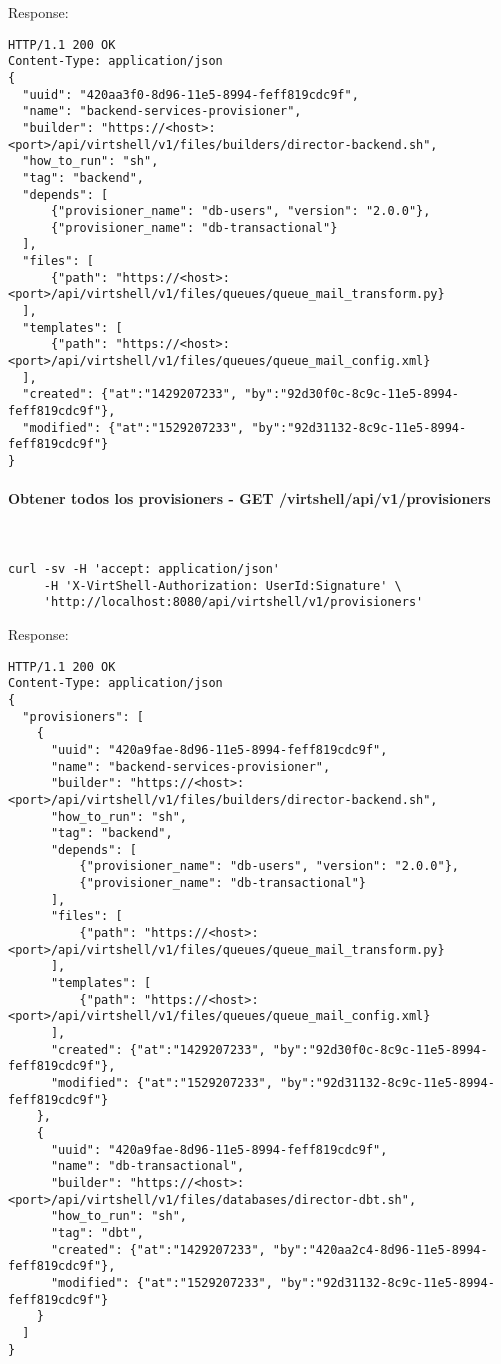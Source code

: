 Response:

\begin{lstlisting}[style=json]
HTTP/1.1 200 OK
Content-Type: application/json
{
  "uuid": "420aa3f0-8d96-11e5-8994-feff819cdc9f",
  "name": "backend-services-provisioner",
  "builder": "https://<host>:<port>/api/virtshell/v1/files/builders/director-backend.sh",
  "how_to_run": "sh",
  "tag": "backend",
  "depends": [
      {"provisioner_name": "db-users", "version": "2.0.0"},
      {"provisioner_name": "db-transactional"}
  ],
  "files": [
      {"path": "https://<host>:<port>/api/virtshell/v1/files/queues/queue_mail_transform.py}
  ],
  "templates": [
      {"path": "https://<host>:<port>/api/virtshell/v1/files/queues/queue_mail_config.xml}
  ],        
  "created": {"at":"1429207233", "by":"92d30f0c-8c9c-11e5-8994-feff819cdc9f"},
  "modified": {"at":"1529207233", "by":"92d31132-8c9c-11e5-8994-feff819cdc9f"}
}
\end{lstlisting}

\paragraph{Obtener todos los provisioners - GET /virtshell/api/v1/provisioners} ~\\

\begin{lstlisting}[style=json]
curl -sv -H 'accept: application/json' 
     -H 'X-VirtShell-Authorization: UserId:Signature' \ 
     'http://localhost:8080/api/virtshell/v1/provisioners'
\end{lstlisting}

Response:

\begin{lstlisting}[style=json]
HTTP/1.1 200 OK
Content-Type: application/json
{
  "provisioners": [
    { 
      "uuid": "420a9fae-8d96-11e5-8994-feff819cdc9f",
      "name": "backend-services-provisioner",
      "builder": "https://<host>:<port>/api/virtshell/v1/files/builders/director-backend.sh",
      "how_to_run": "sh",
      "tag": "backend",
      "depends": [
          {"provisioner_name": "db-users", "version": "2.0.0"},
          {"provisioner_name": "db-transactional"}
      ],
      "files": [
          {"path": "https://<host>:<port>/api/virtshell/v1/files/queues/queue_mail_transform.py}
      ],
      "templates": [
          {"path": "https://<host>:<port>/api/virtshell/v1/files/queues/queue_mail_config.xml}
      ],        
      "created": {"at":"1429207233", "by":"92d30f0c-8c9c-11e5-8994-feff819cdc9f"},
      "modified": {"at":"1529207233", "by":"92d31132-8c9c-11e5-8994-feff819cdc9f"}
    },
    { 
      "uuid": "420a9fae-8d96-11e5-8994-feff819cdc9f",
      "name": "db-transactional",
      "builder": "https://<host>:<port>/api/virtshell/v1/files/databases/director-dbt.sh",
      "how_to_run": "sh",
      "tag": "dbt",        
      "created": {"at":"1429207233", "by":"420aa2c4-8d96-11e5-8994-feff819cdc9f"},
      "modified": {"at":"1529207233", "by":"92d31132-8c9c-11e5-8994-feff819cdc9f"}
    }    
  ]
} 
\end{lstlisting}

